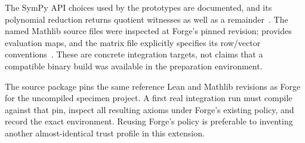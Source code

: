 The SymPy API choices used by the prototypes are documented, and its polynomial
reduction returns quotient witnesses as well as a remainder~\cite{sympy-polys}.
The named Mathlib source files were inspected at Forge's pinned revision;
 provides evaluation maps, and the matrix file explicitly
specifies its row/vector conventions~\cite{mathlib-eval,mathlib-matrix}.
These are concrete integration targets, not claims that a compatible binary
build was available in the preparation environment.

The source package pins the same reference Lean and Mathlib revisions as Forge
for the uncompiled specimen project. A first real integration run must compile
against that pin, inspect all resulting axioms under Forge's existing policy,
and record the exact environment. Reusing Forge's policy is preferable to
inventing another almost-identical trust profile in this extension.
